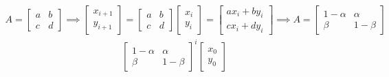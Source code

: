 \\
\begin{gather*}
    A = \begin{bmatrix}
        a & b \\
        c & d
    \end{bmatrix} \implies
    \begin{bmatrix}
        x_{i+1}\\
        y_{i+1}
    \end{bmatrix}
    =
    \begin{bmatrix}
        a & b \\
        c & d
    \end{bmatrix}
    \begin{bmatrix}
        x_i\\
        y_i
    \end{bmatrix}
    =
    \begin{bmatrix}
        ax_i + by_i\\
        cx_i + dy_i
    \end{bmatrix}
    \implies
    A = \begin{bmatrix}
        1-\alpha & \alpha \\
        \beta & 1-\beta
    \end{bmatrix}
\end{gather*}
\begin{gather*}
    \begin{bmatrix}
        1-\alpha & \alpha \\
        \beta & 1-\beta
    \end{bmatrix}^i
    \begin{bmatrix}
        x_0\\
        y_0
    \end{bmatrix}
\end{gather*}
